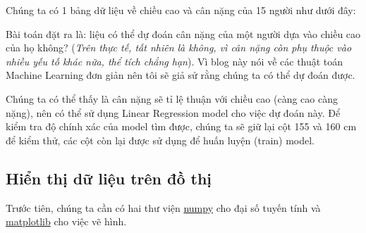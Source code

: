 Chúng ta có 1 bảng dữ liệu về chiều cao và cân nặng của 15 người như
dưới đây:


Bài toán đặt ra là: liệu có thể dự đoán cân nặng của một người dựa vào
chiều cao của họ không? (\emph{Trên thực tế, tất nhiên là không, vì cân
nặng còn phụ thuộc vào nhiều yếu tố khác nữa, thể tích chẳng hạn}). Vì
blog này nói về các thuật toán Machine Learning đơn giản nên tôi sẽ giả
sử rằng chúng ta có thể dự đoán được.

Chúng ta có thể thấy là cân nặng sẽ tỉ lệ thuận với chiều cao (càng cao
càng nặng), nên có thể sử dụng Linear Regression model cho việc dự đoán
này. Để kiểm tra độ chính xác của model tìm được, chúng ta sẽ giữ lại
cột 155 và 160 cm để kiểm thử, các cột còn lại được sử dụng để huấn
luyện (train) model.

\subsection{Hiển thị dữ liệu trên đồ
thị}\label{hiux1ec3n-thux1ecb-dux1eef-liux1ec7u-truxean-ux111ux1ed3-thux1ecb}

Trước tiên, chúng ta cần có hai thư viện
\href{http://www.numpy.org/}{numpy} cho đại số tuyến tính và
\href{http://matplotlib.org/}{matplotlib} cho việc vẽ hình.



